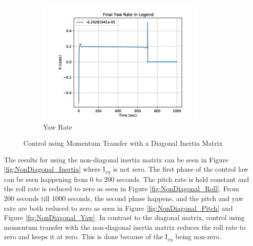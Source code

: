 \documentclass[conf]{new-aiaa}
\begin{document}
\begin{figure}[H]
     \begin{subfigure}[b]{0.3\textwidth}
         \centering
         \includegraphics[width=\textwidth]{Figures/2StageControl/Yaw_Diaganol_Matrix.png}
         \caption{Yaw Rate}
         \label{fig:Diagonal_Yaw}
     \end{subfigure}
        \caption{Control using Momentum Transfer with a Diagonal Inertia Matrix}
        \label{fig:Diagonal_Inertia}
\end{figure}

\noindent The results for using the non-diagonal inertia matrix can be seen in Figure \ref{fig:NonDiagonal_Inertia} where I$_{xy}$ is not zero. The first phase of the control law can be seen happening from 0 to 200 seconds. The pitch rate is held constant and the roll rate is reduced to zero as seen in Figure \ref{fig:NonDiagonal_Roll}. From 200 seconds till 1000 seconds, the second phase happens, and the pitch and yaw rate are both reduced to zero as seen in Figure \ref{fig:NonDiagonal_Pitch} and Figure \ref{fig:NonDiagonal_Yaw}. In contrast to the diagonal matrix, control using momentum transfer with the non-diagonal inertia matrix reduces the roll rate to zero and keeps it at zero. This is done because of the I$_{xy}$ being non-zero. 
\end{document}
